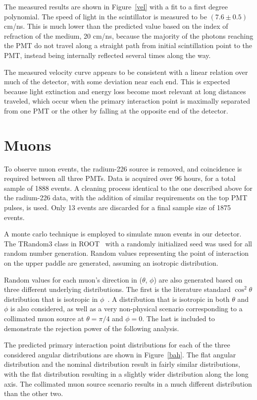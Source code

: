 The measured results are shown in Figure~\ref{vel} with a fit to a first degree polynomial. The speed of light in the scintillator is measured to be $(7.6\pm0.5)$ cm/ns. This is much lower than the predicted value based on the index of refraction of the medium, 20 cm/ns, because the majority of the photons reaching the PMT do not travel along a straight path from initial scintillation point to the PMT, instead being internally reflected several times along the way. 

The measured velocity curve appears to be consistent with a linear relation over much of the detector, with some deviation near each end. This is expected because light extinction and energy loss become most relevant at long distances traveled, which occur when the primary interaction point is maximally separated from one PMT or the other by falling at the opposite end of the detector. 

\section{Muons}

To observe muon events, the radium-226 source is removed, and coincidence is required between all three PMTs. Data is acquired over 96 hours, for a total sample of 1888 events. A cleaning process identical to the one described above for the radium-226 data, with the addition of similar requirements on the top PMT pulses, is used. Only 13 events are discarded for a final sample size of 1875 events. 

A monte carlo technique is employed to simulate muon events in our detector. The TRandom3 class in ROOT~\cite{root} with a randomly initialized seed was used for all random number generation. Random values representing the point of interaction on the upper paddle are generated, assuming an isotropic distribution.

Random values for each muon's direction in ($\theta$, $\phi$) are also generated based on three different underlying distributions. The first is the literature standard $\cos^2{\theta}$ distribution that is isotropic in $\phi$~\cite{kuo}. A distribution that is isotropic in both $\theta$ and $\phi$ is also considered, as well as a very non-physical scenario corresponding to a collimated muon source at $\theta=\pi/4$ and $\phi=0$. The last is included to demonstrate the rejection power of the following analysis. 

The predicted primary interaction point distributions for each of the three considered angular distributions are shown in Figure~\ref{bah}. The flat angular distribution and the nominal distribution result in fairly similar distributions, with the flat distribution resulting in a slightly wider distribution along the long axis. The collimated muon source scenario results in a much different distribution than the other two. 

